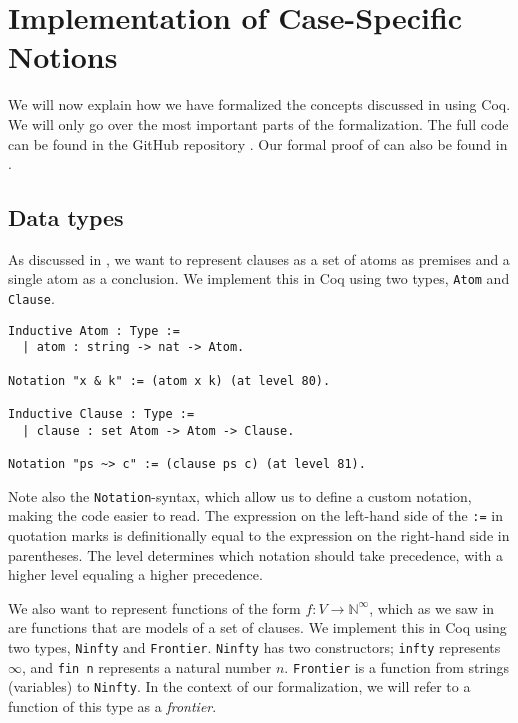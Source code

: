 \chapter{Implementation of Case-Specific Notions}
\label{chap:implementation}

We will now explain how we have formalized the
concepts discussed in  using Coq.
We will only go over the most important parts of the formalization.
The full code can be found in the GitHub repository \cite{bakseter}.
Our formal proof of  can also be found in .

\section{Data types}

As discussed in , we want to represent clauses as
a set of atoms as premises and a single atom as a conclusion.
We implement this in Coq using two types, \lstinline{Atom} and \lstinline{Clause}.

\begin{minipage}{\linewidth}
\begin{lstlisting}[language=Coq, label={lst:atom_clause_def}, caption={\lstinline{Atom} and \lstinline{Clause} in Coq}]
Inductive Atom : Type :=
  | atom : string -> nat -> Atom.

Notation "x & k" := (atom x k) (at level 80).

Inductive Clause : Type :=
  | clause : set Atom -> Atom -> Clause.

Notation "ps ~> c" := (clause ps c) (at level 81).
\end{lstlisting}
\end{minipage}

Note also the \lstinline{Notation}-syntax, which allow us to define a custom notation,
making the code easier to read. The expression on the left-hand side of the \lstinline{:=} in quotation marks
is definitionally equal to the expression on the right-hand side in parentheses.
The level determines which notation should take precedence, with a higher level equaling a higher precedence.

We also want to represent functions of the form $f : V \rightarrow \mathbb{N}^{\infty}$,
which as we saw in 
are functions that are models of a set of clauses.
We implement this in Coq using two types, \lstinline{Ninfty} and \lstinline{Frontier}.
\lstinline{Ninfty} has two constructors; \lstinline{infty} represents $\infty$,
and \lstinline{fin n} represents a natural number $n$.
\lstinline{Frontier} is a function from strings (variables) to \lstinline{Ninfty}.
In the context of our formalization, we will refer to a function of this
type as a \emph{frontier}.

